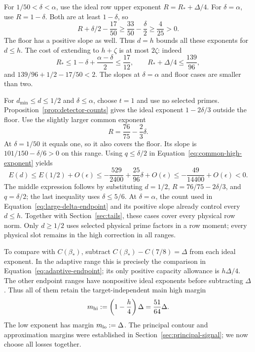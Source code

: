 For \(1/50<\delta<\alpha\), use the ideal row upper exponent
\(R=R_*+\Delta/4\).  For \(\delta=\alpha\), use
\(R=1-\delta\).  Both are at least \(1-\delta\), so
\[
 R+\delta/2-\frac{17}{50}
 \ge\frac{33}{50}-\frac{\delta}{2}\ge\frac4{25}>0.
\]
The floor has a positive slope as well.  Thus \(d=h\) bounds
all these exponents for \(d\le h\).  The cost of extending to
\(h+\zeta\) is at most \(2\zeta\): indeed
\[
 R_*\le1-\delta+\frac{\alpha-\delta}{2}\le\frac{17}{12},
 \qquad
 R_*+\Delta/4\le\frac{139}{96},
\]
and \(139/96+1/2-17/50<2\).  The slopes at \(\delta=\alpha\)
and floor cases are smaller than two.

For \(d_{\min}\le d\le1/2\) and \(\delta\le\alpha\), choose \(t=1\)
and use no selected primes.  Proposition~\ref{prop:detector-counts}
gives the ideal exponent \(1-2\delta/3\) outside the floor.
Use the slightly larger common exponent
\[
 R=\frac{76}{75}-\frac23\delta.
\]
At \(\delta=1/50\) it equals one, so it also covers the floor.
Its slope is \(101/150-\delta/6>0\) on this range.
Using \(q\le\delta/2\) in
Equation~\eqref{eq:common-high-exponent} yields
\begin{equation}
 E(d)\le E(1/2)+O(\epsilon)
 \le-\frac{529}{2400}+\frac{25}{96}\delta+O(\epsilon)
 \le-\frac{49}{14400}+O(\epsilon)<0.
 \label{eq:adaptive-intermediate}
\end{equation}
The middle expression follows by substituting
\(d=1/2\), \(R=76/75-2\delta/3\), and \(q=\delta/2\);
the last inequality uses \(\delta\le5/6\).
At \(\delta=\alpha\), the count used in
Equation~\eqref{eq:large-delta-endpoint} and its positive slope
already control every \(d\le h\).
Together with Section~\ref{sec:tails}, these cases cover every
physical row norm.  Only \(d\ge1/2\) uses selected physical prime factors
in a row moment; every physical slot remains in the high correction in all
ranges.

To compare with \(C(\beta_*)\), subtract
\(C(\beta_*)-C(7/8)=\Delta\) from each ideal exponent.
In the adaptive range this is precisely the comparison in
Equation~\eqref{eq:adaptive-endpoint}; its only positive capacity
allowance is \(h\Delta/4\).  The other endpoint ranges have
nonpositive ideal exponents before subtracting \(\Delta\).
Thus all of them retain the target-independent main high margin
\[
 m_{\rm hi}:=\left(1-\frac h4\right)\Delta
             =\frac{51}{64}\Delta.
\]
The low exponent has margin \(m_{\rm lo}:=\Delta\).
The principal contour and approximation margins were established in
Section~\ref{sec:principal-signal}; we now choose all losses together.

